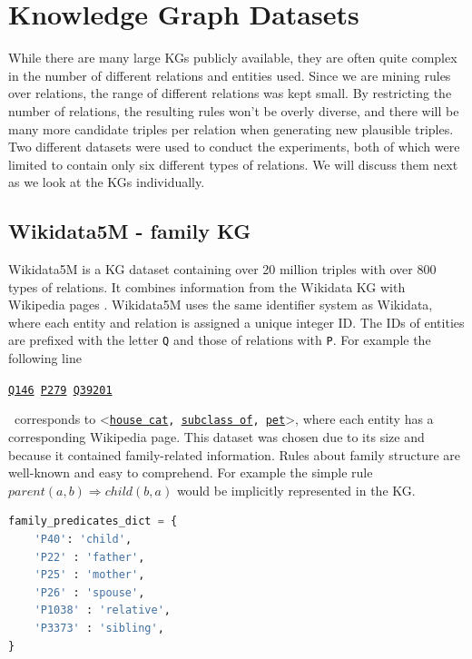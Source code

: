 \section{Knowledge Graph Datasets}
While there are many large KGs publicly available, they are often quite complex in the number of different relations and entities used. Since we are mining rules over relations, the range of different relations was kept small. By restricting the number of relations, the resulting rules won't be overly diverse, and there will be many more candidate triples per relation when generating new plausible triples. Two different datasets were used to conduct the experiments, both of which were limited to contain only six different types of relations. We will discuss them next as we look at the KGs individually.


\subsection{Wikidata5M - family KG}
Wikidata5M is a KG dataset containing over 20 million triples with over 800 types of relations. It combines information from the Wikidata KG with Wikipedia pages \cite{wang2019kepler}. Wikidata5M uses the same identifier system as Wikidata, where each entity and relation is assigned a unique integer ID. The IDs of entities are prefixed with the letter \texttt{Q} and those of relations with \texttt{P}. For example the following line \\
\centerline{\texttt{\href{https://www.wikidata.org/wiki/Q146}{Q146} \quad \href{https://www.wikidata.org/wiki/Property:P279}{P279} \quad  \href{https://www.wikidata.org/wiki/Q39201}{Q39201}}} \
corresponds to \textless\texttt{\href{https://www.wikidata.org/wiki/Q146}{house cat}, \href{https://www.wikidata.org/wiki/Property:P279}{subclass of}, \href{https://www.wikidata.org/wiki/Q39201}{pet}}\textgreater, where each entity has a corresponding Wikipedia page.
This dataset was chosen due to its size and because it contained family-related information. Rules about family structure are well-known and easy to comprehend. For example the simple rule $parent(a, b) \Rightarrow  child(b, a)$ would be implicitly represented in the KG.
\begin{lstlisting}[float, language=Python, caption={Python dictionary converting family predicate IDs to their names.},captionpos=t, label={family_predicated_dict}]
family_predicates_dict = {
    'P40': 'child', 
    'P22' : 'father', 
    'P25' : 'mother',
    'P26' : 'spouse', 
    'P1038' : 'relative', 
    'P3373' : 'sibling', 
}
\end{lstlisting}

